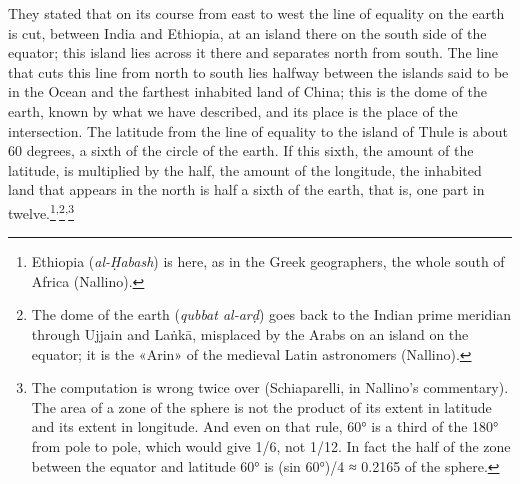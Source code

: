 \documentclass[11pt]{article}
\newcommand{\ArPage}[1]{\marginpar{\footnotesize\color{gray}Ar.\,p.\,#1}}
\begin{document}
\par \ArPage{26}They stated that on its course from east to west the line of equality on the earth is cut, between India and Ethiopia, at an island there on the south side of the equator; this island lies across it there and separates north from south. The line that cuts this line from north to south lies halfway between the islands said to be in the Ocean and the farthest inhabited land of China; this is the dome of the earth, known by what we have described, and its place is the place of the intersection. The latitude from the line of equality to the island of Thule is about 60 degrees, a sixth of the circle of the earth. If this sixth, the amount of the latitude, is multiplied by the half, the amount of the longitude, the inhabited land that appears in the north is half a sixth of the earth, that is, one part in twelve.\footnote{Ethiopia (\emph{al-Ḥabash}) is here, as in the Greek geographers, the whole south of Africa (Nallino).}\textsuperscript{,}\footnote{The dome of the earth (\emph{qubbat al-arḍ}) goes back to the Indian prime meridian through Ujjain and Laṅkā, misplaced by the Arabs on an island on the equator; it is the «Arin» of the medieval Latin astronomers (Nallino).}\textsuperscript{,}\footnote{The computation is wrong twice over (Schiaparelli, in Nallino's commentary). The area of a zone of the sphere is not the product of its extent in latitude and its extent in longitude. And even on that rule, 60° is a third of the 180° from pole to pole, which would give 1/6, not 1/12. In fact the half of the zone between the equator and latitude 60° is (sin 60°)/4 ≈ 0.2165 of the sphere.}\par
\end{document}
